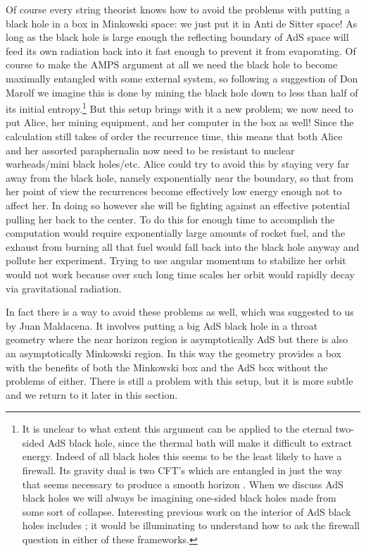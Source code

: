 \documentclass[12pt]{article}
\begin{document}
Of course every string theorist knows how to avoid the problems with putting a black hole in a box in Minkowski space: we just put it in Anti de Sitter space!  As long as the black hole is large enough the reflecting boundary of AdS space will feed its own radiation back into it fast enough to prevent it from evaporating.  Of course to make the AMPS argument at all we need the black hole to become maximally entangled with some external system, so following a suggestion of Don Marolf we imagine this is done by mining the black hole down to less than half of its initial entropy.\footnote{It is unclear to what extent this argument can be applied to the eternal two-sided AdS black hole, since the thermal bath will make it difficult to extract energy.  Indeed of all black holes this seems to be the least likely to have a firewall.  Its gravity dual is two CFT's which are entangled in just the way that seems necessary to produce a smooth horizon \cite{Maldacena:2001kr}.  When we discuss AdS black holes we will always be imagining one-sided black holes made from some sort of collapse.  Interesting previous work on the interior of AdS black holes includes \cite{Fidkowski:2003nf,Horowitz:2009wm}; it would be illuminating to understand how to ask the firewall question in either of these frameworks.}  But this setup brings with it a new problem; we now need to put Alice, her mining equipment, and her computer in the box as well!  Since the calculation still takes of order the recurrence time, this means that both Alice and her assorted paraphernalia now need to be resistant to nuclear warheads/mini black holes/etc.  Alice could try to avoid this by staying very far away from the black hole, namely exponentially near the boundary, so that from her point of view the recurrences become effectively low energy enough not to affect her.  In doing so however she will be fighting against an effective potential pulling her back to the center.  To do this for enough time to accomplish the computation would require exponentially large amounts of rocket fuel, and the exhaust from burning all that fuel would fall back into the black hole anyway and pollute her experiment.  Trying to use angular momentum to stabilize her orbit would not work because over such long time scales her orbit would rapidly decay via gravitational radiation.  

In fact there is a way to avoid these problems as well, which was suggested to us by Juan Maldacena.  It involves putting a big AdS black hole in a throat geometry where the near horizon region is asymptotically AdS but there is also an asymptotically Minkowski region.  In this way the geometry provides a box with the benefits of both the Minkowski box and the AdS box without the problems of either.  There is still a problem with this setup, but it is more subtle and we return to it later in this section.
\end{document}
